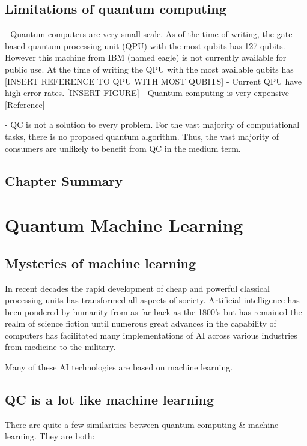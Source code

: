 \documentclass{book}
\begin{document}
\section{Limitations of quantum computing}

- Quantum computers are very small scale. As of the time of writing, the gate-based quantum processing unit (QPU) with the most qubits has 127 qubits. However this machine from IBM (named eagle) is not currently available for public use. At the time of writing the QPU with the most available qubits has [INSERT REFERENCE TO QPU WITH MOST QUBITS]
- Current QPU have high error rates. [INSERT FIGURE]
- Quantum computing is very expensive [Reference]

- QC is not a solution to every problem. For the vast majority of computational tasks, there is no proposed quantum algorithm. Thus, the vast majority of consumers are unlikely to benefit from QC in the medium term.


\section{Chapter Summary}


\chapter{Quantum Machine Learning}

\section{Mysteries of machine learning}


In recent decades the rapid development of cheap and powerful classical processing units has transformed all aspects of society. Artificial intelligence has been pondered by humanity from as far back as the 1800's but has remained the realm of science fiction until numerous great advances in the capability of computers has facilitated many implementations of AI across various industries from medicine to the military. 

Many of these AI technologies are based on machine learning. 

\section{QC is a lot like machine learning}

There are quite a few similarities between quantum computing \& machine learning. They are both:
\end{document}
